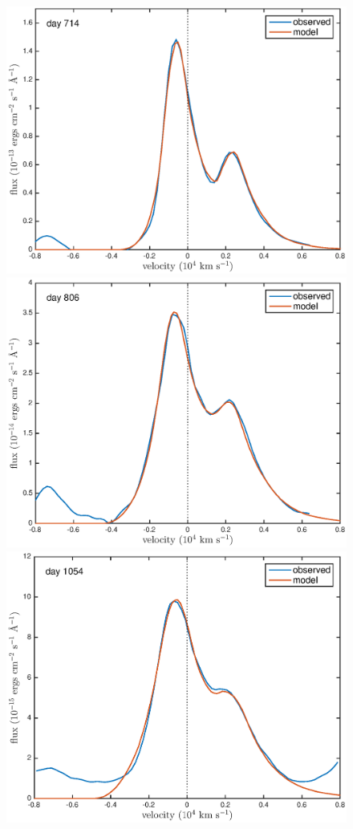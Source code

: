 \documentclass[useAMS,usenatbib,usegraphicx]{mnras}
\begin{document}
\begin{figure}
\begin{center}

\includegraphics[trim =33 10 45 15,clip=true,scale=0.47]{smooth/best_fit/d714OI_new}
\includegraphics[trim =33 10 45 15,clip=true,scale=0.47]{smooth/best_fit/d806OI_new}
\includegraphics[trim =33 10 45 15,clip=true,scale=0.47]{smooth/best_fit/d1054OI}

\end{center}
\end{figure}
\end{document}
